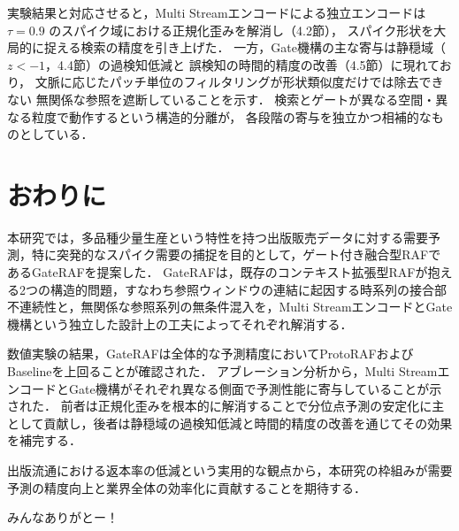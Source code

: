 \documentclass[twocolumn, lastpage]{jarticle}
\begin{document}
実験結果と対応させると，Multi Streamエンコードによる独立エンコードは
$\tau=0.9$ のスパイク域における正規化歪みを解消し（4.2節），
スパイク形状を大局的に捉える検索の精度を引き上げた．
一方，Gate機構の主な寄与は静穏域（$z < -1$，4.4節）の過検知低減と
誤検知の時間的精度の改善（4.5節）に現れており，
文脈に応じたパッチ単位のフィルタリングが形状類似度だけでは除去できない
無関係な参照を遮断していることを示す．
検索とゲートが異なる空間・異なる粒度で動作するという構造的分離が，
各段階の寄与を独立かつ相補的なものとしている．






\section{おわりに}
本研究では，多品種少量生産という特性を持つ出版販売データに対する需要予測，特に突発的なスパイク需要の捕捉を目的として，ゲート付き融合型RAFであるGateRAFを提案した．
GateRAFは，既存のコンテキスト拡張型RAFが抱える2つの構造的問題，すなわち参照ウィンドウの連結に起因する時系列の接合部不連続性と，無関係な参照系列の無条件混入を，Multi StreamエンコードとGate機構という独立した設計上の工夫によってそれぞれ解消する．

数値実験の結果，GateRAFは全体的な予測精度においてProtoRAFおよびBaselineを上回ることが確認された．
アブレーション分析から，Multi StreamエンコードとGate機構がそれぞれ異なる側面で予測性能に寄与していることが示された．
前者は正規化歪みを根本的に解消することで分位点予測の安定化に主として貢献し，後者は静穏域の過検知低減と時間的精度の改善を通じてその効果を補完する．

出版流通における返本率の低減という実用的な観点から，本研究の枠組みが需要予測の精度向上と業界全体の効率化に貢献することを期待する．





\shaji
みんなありがとー！
\end{document}
